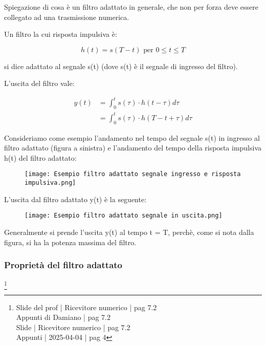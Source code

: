 \begin{tcolorbox}
    Spiegazione di cosa è un filtro adattato in generale, 
    che non per forza deve essere collegato ad una trasmissione numerica.
\end{tcolorbox}

Un filtro la cui risposta impulsiva è: 

{
    \Large 
    \begin{equation}
        h(t) = s(T - t) \text{ per } 0 \le t \le T
    \end{equation}
}

si dice adattato al segnale s(t) (dove s(t) è il segnale di ingresso del filtro). \newline 

L'uscita del filtro vale: 

{
    \Large 
    \begin{equation}
        \begin{split}
            y(t)
            &= 
            \int_{0}^{t}
            s(\tau) \cdot h (t - \tau) d\tau
            \\
            &= 
            \int_{0}^{t}
            s(\tau) \cdot h (T - t + \tau) d\tau
        \end{split}
    \end{equation}
}

Consideriamo come esempio l'andamento nel tempo 
del segnale s(t) in ingresso al filtro adattato (figura a sinistra) 
e l'andamento del tempo della risposta impulsiva h(t) del filtro adattato: 

\begin{figure}[h]
    \centering
    \texttt{[image: Esempio filtro adattato segnale ingresso e risposta impulsiva.png]}
\end{figure}

L'uscita dal filtro adattato y(t) è la seguente: 

\begin{figure}[h]
    \centering
    \texttt{[image: Esempio filtro adattato segnale in uscita.png]}
\end{figure}

Generalmente si prende l'uscita y(t) al tempo t = T, perchè, come si nota dalla figura, si ha la potenza massima del filtro. \newline 

\newpage 

\subsubsection{Proprietà del filtro adattato}
\footnote{Slide del prof | Ricevitore numerico | pag 7.2 \\  
Appunti di Damiano | pag 7.2 \\
Slide | Ricevitore numerico | pag 7.2 \\
Appunti | 2025-04-04 | pag 4
}

